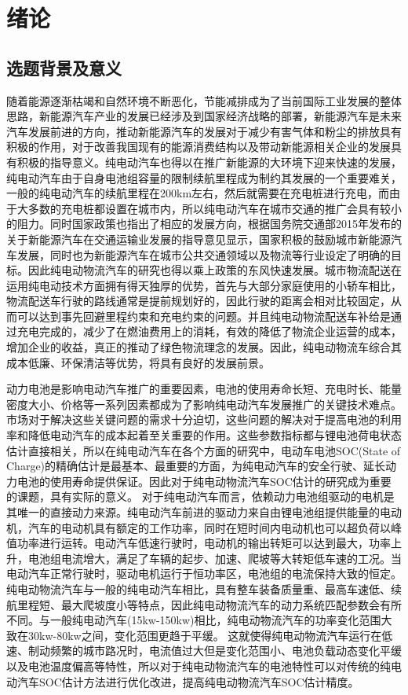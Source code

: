 
\chapter{绪论}
\section{选题背景及意义}
随着能源逐渐枯竭和自然环境不断恶化，节能减排成为了当前国际工业发展的整体思路，新能源汽车产业的发展已经涉及到国家经济战略的部署，新能源汽车是未来汽车发展前进的方向，推动新能源汽车的发展对于减少有害气体和粉尘的排放具有积极的作用，对于改善我国现有的能源消费结构以及带动新能源相关企业的发展具有积极的指导意义。纯电动汽车也得以在推广新能源的大环境下迎来快速的发展，纯电动汽车由于自身电池组容量的限制续航里程成为制约其发展的一个重要难关，一般的纯电动汽车的续航里程在200km左右，然后就需要在充电桩进行充电，而由于大多数的充电桩都设置在城市内，所以纯电动汽车在城市交通的推广会具有较小的阻力。同时国家政策也指出了相应的发展方向，根据国务院交通部2015年发布的关于新能源汽车在交通运输业发展的指导意见显示，国家积极的鼓励城市新能源汽车发展，同时也为新能源汽车在城市公共交通领域以及物流等行业设定了明确的目标。因此纯电动物流汽车的研究也得以乘上政策的东风快速发展。城市物流配送在运用纯电动技术方面拥有得天独厚的优势，首先与大部分家庭使用的小轿车相比，物流配送车行驶的路线通常是提前规划好的，因此行驶的距离会相对比较固定，从而可以达到事先回避里程约束和充电约束的问题。并且纯电动物流配送车补给是通过充电完成的，减少了在燃油费用上的消耗，有效的降低了物流企业运营的成本，增加企业的收益，真正的推动了绿色物流理念的发展。因此，纯电动物流车综合其成本低廉、环保清洁等优势，将具有良好的发展前景。

	动力电池是影响电动汽车推广的重要因素，电池的使用寿命长短、充电时长、能量密度大小、价格等一系列因素都成为了影响纯电动汽车发展推广的关键技术难点。市场对于解决这些关键问题的需求十分迫切，这些问题的解决对于提高电池的利用率和降低电动汽车的成本起着至关重要的作用。这些参数指标都与锂电池荷电状态估计直接相关，所以在纯电动汽车在各个方面的研究中，电动车电池SOC(State of Charge)的精确估计是最基本、最重要的方面，为纯电动汽车的安全行驶、延长动力电池的使用寿命提供保证。因此对于纯电动物流汽车SOC估计的研究成为重要的课题，具有实际的意义。
对于纯电动汽车而言，依赖动力电池组驱动的电机是其唯一的直接动力来源。纯电动汽车前进的驱动力来自由锂电池组提供能量的电动机，汽车的电动机具有额定的工作功率，同时在短时间内电动机也可以超负荷以峰值功率进行运转。电动汽车低速行驶时，电动机的输出转矩可以达到最大，功率上升，电池组电流增大，满足了车辆的起步、加速、爬坡等大转矩低车速的工况。当电动汽车正常行驶时，驱动电机运行于恒功率区，电池组的电流保持大致的恒定。纯电动物流汽车与一般的纯电动汽车相比，具有整车装备质量重、最高车速低、续航里程短、最大爬坡度小等特点，因此纯电动物流汽车的动力系统匹配参数会有所不同。与一般纯电动汽车(15kw-150kw)相比，纯电动物流汽车的功率变化范围大致在30kw-80kw之间，变化范围更趋于平缓。 这就使得纯电动物流汽车运行在低速、制动频繁的城市路况时，电流值过大但是变化范围小、电池负载动态变化平缓以及电池温度偏高等特性，所以对于纯电动物流汽车的电池特性可以对传统的纯电动汽车SOC估计方法进行优化改进，提高纯电动物流汽车SOC估计精度。

